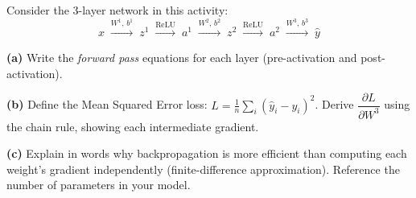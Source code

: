 \documentclass[12pt,a4paper]{article}
\begin{document}
\vspace{6pt}

\begin{tcolorbox}[colback=lightblue!40, colframe=myColorB,
  title={\textbf{Question 1 — Backpropagation Mechanics} \hfill \normalfont(15 pts)},
  fonttitle=\normalsize\bfseries, breakable]

Consider the 3-layer network in this activity:
\[
x \;\xrightarrow{W^1,\,b^1}\; z^1 \;\xrightarrow{\text{ReLU}}\; a^1
  \;\xrightarrow{W^2,\,b^2}\; z^2 \;\xrightarrow{\text{ReLU}}\; a^2
  \;\xrightarrow{W^3,\,b^3}\; \hat{y}
\]

\textbf{(a)} Write the \emph{forward pass} equations for each layer
(pre-activation and post-activation).

\textbf{(b)} Define the Mean Squared Error loss:
$L = \frac{1}{n}\sum_i(\hat{y}_i - y_i)^2$.
Derive $\dfrac{\partial L}{\partial W^3}$ using the chain rule, showing each
intermediate gradient.

\textbf{(c)} Explain in words why backpropagation is more efficient than computing
each weight's gradient independently (finite-difference approximation). Reference
the number of parameters in your model.
\end{tcolorbox}
\end{document}
